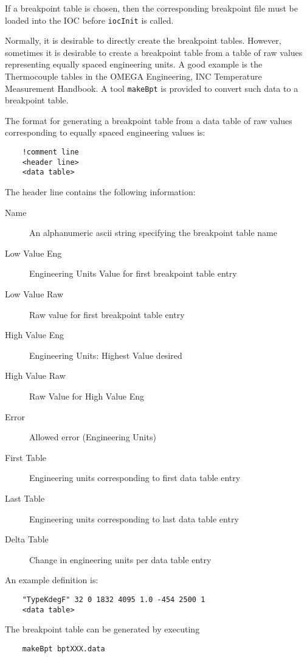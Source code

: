If a breakpoint table is chosen, then the corresponding breakpoint file must be loaded into the IOC before \verb|iocInit| is called.

Normally, it is desirable to directly create the breakpoint tables.
However, sometimes it is desirable to create a breakpoint table from a table of raw values representing equally spaced engineering units.
A good example is the Thermocouple tables in the OMEGA Engineering, INC Temperature Measurement Handbook.
A tool \verb|makeBpt| is provided to convert such data to a breakpoint table.

The format for generating a breakpoint table from a data table of raw values corresponding to equally spaced engineering values is:

\begin{verbatim}
    !comment line
    <header line>
    <data table>
\end{verbatim}

The header line contains the following information:

\begin{description}
\item [Name] An alphanumeric ascii string specifying the breakpoint table name
\item [Low Value Eng] Engineering Units Value for first breakpoint table entry
\item [Low Value Raw] Raw value for first breakpoint table entry
\item [High Value Eng] Engineering Units: Highest Value desired
\item [High Value Raw] Raw Value for High Value Eng
\item [Error] Allowed error (Engineering Units)
\item [First Table] Engineering units corresponding to first data table entry
\item [Last Table] Engineering units corresponding to last data table entry
\item [Delta Table] Change in engineering units per data table entry
\end{description}

 An example definition is:

\begin{verbatim}
    "TypeKdegF" 32 0 1832 4095 1.0 -454 2500 1
    <data table>
\end{verbatim}

The breakpoint table can be generated by executing

\begin{verbatim}
    makeBpt bptXXX.data
\end{verbatim}

